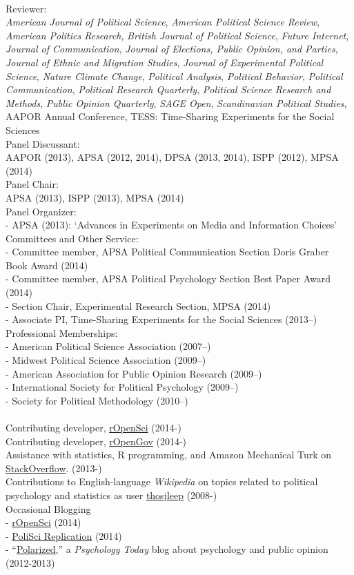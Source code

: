 \documentclass[12pt]{article}
\newcommand{\topic}[1]{\pagebreak[3]\indent {\color{lg}{\footnotesize #1 }}\\}
\newcommand{\entry}[1]{\indent {\color{lg}\guillemotright}\hspace{2pt}#1\vspace{.25em}\\}
\newcommand{\subentry}[1]{{\color{lg}-} #1\vspace{.25em}\\}
\begin{document}
\topic{Disciplinary}
\entry{Reviewer:\\{\em American Journal of Political Science}, {\em American Political Science Review}, {\em American Politics Research}, {\em British Journal of Political Science}, {\em Future Internet}, {\em Journal of Communication}, {\em Journal of Elections, Public Opinion, and Parties}, {\em Journal of Ethnic and Migration Studies}, {\em Journal of Experimental Political Science}, {\em Nature Climate Change}, {\em Political Analysis}, {\em Political Behavior}, {\em Political Communication}, {\em Political Research Quarterly}, {\em Political Science Research and Methods}, {\em Public Opinion Quarterly}, {\em SAGE Open}, {\em Scandinavian Political Studies}, AAPOR Annual Conference, TESS: Time-Sharing Experiments for the Social Sciences}
\entry{Panel Discussant:\\AAPOR (2013), APSA (2012, 2014), DPSA (2013, 2014), ISPP (2012), MPSA (2014)}
\entry{Panel Chair:\\APSA (2013), ISPP (2013), MPSA (2014)}
\entry{Panel Organizer:}
\subentry{APSA (2013): `Advances in Experiments on Media and Information Choices'}
\entry{Committees and Other Service:}
\subentry{Committee member, APSA Political Communication Section Doris Graber Book Award (2014)}
\subentry{Committee member, APSA Political Psychology Section Best Paper Award (2014)}
\subentry{Section Chair, Experimental Research Section, MPSA (2014)}
\subentry{Associate PI, Time-Sharing Experiments for the Social Sciences (2013--)}
\entry{Professional Memberships:}
\subentry{American Political Science Association (2007--)}
\subentry{Midwest Political Science Association (2009--)}
\subentry{American Association for Public Opinion Research (2009--)}
\subentry{International Society for Political Psychology (2009--)}
\subentry{Society for Political Methodology (2010--)}

\topic{Public Engagement}
\entry{Contributing developer, \href{http://ropensci.org/}{rOpenSci} (2014-)}
\entry{Contributing developer, \href{http://ropengov.github.io/}{rOpenGov} (2014-)}
\entry{Assistance with statistics, R programming, and Amazon Mechanical Turk on \href{http://stackoverflow.com/users/2338862/thomas}{StackOverflow}. (2013-)}
\entry{Contributions to English-language {\em Wikipedia} on topics related to political psychology and statistics as user \href{http://en.wikipedia.org/wiki/Special:Contributions/Thosjleep}{thosjleep} (2008-)}
\entry{Occasional Blogging}
\subentry{\href{http://ropensci.org/blog/}{rOpenSci} (2014)}
\subentry{\href{http://politicalsciencereplication.wordpress.com/}{PoliSci Replication} (2014)}
\subentry{``\href{http://www.psychologytoday.com/blog/polarized}{Polarized},'' a {\em Psychology Today} blog about psychology and public opinion (2012-2013)}
\end{document}
